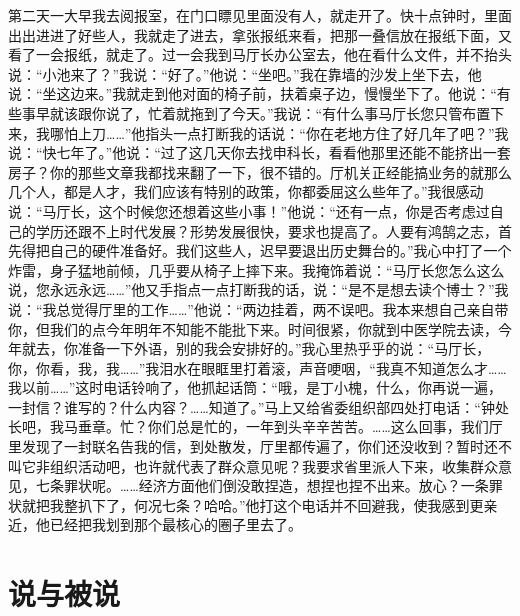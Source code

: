 \documentclass[12pt,oneside]{book}
\begin{document}
第二天一大早我去阅报室，在门口瞟见里面没有人，就走开了。快十点钟时，里面出出进进了好些人，我就走了进去，拿张报纸来看，把那一叠信放在报纸下面，又看了一会报纸，就走了。过一会我到马厅长办公室去，他在看什么文件，并不抬头说：``小池来了？''我说：``好了。''他说：``坐吧。''我在靠墙的沙发上坐下去，他说：``坐这边来。''我就走到他对面的椅子前，扶着桌子边，慢慢坐下了。他说：``有些事早就该跟你说了，忙着就拖到了今天。''我说：``有什么事马厅长您只管布置下来，我哪怕上刀\ldots\ldots{}''他指头一点打断我的话说：``你在老地方住了好几年了吧？''我说：``快七年了。''他说：``过了这几天你去找申科长，看看他那里还能不能挤出一套房子？你的那些文章我都找来翻了一下，很不错的。厅机关正经能搞业务的就那么几个人，都是人才，我们应该有特别的政策，你都委屈这么些年了。''我很感动说：``马厅长，这个时候您还想着这些小事！''他说：``还有一点，你是否考虑过自己的学历还跟不上时代发展？形势发展很快，要求也提高了。人要有鸿鹄之志，首先得把自己的硬件准备好。我们这些人，迟早要退出历史舞台的。''我心中打了一个炸雷，身子猛地前倾，几乎要从椅子上摔下来。我掩饰着说：``马厅长您怎么这么说，您永远永远\ldots\ldots{}''他又手指点一点打断我的话，说：``是不是想去读个博士？''我说：``我总觉得厅里的工作\ldots\ldots{}''他说：``两边挂着，两不误吧。我本来想自己亲自带你，但我们的点今年明年不知能不能批下来。时间很紧，你就到中医学院去读，今年就去，你准备一下外语，别的我会安排好的。''我心里热乎乎的说：``马厅长，你，你看，我，我\ldots\ldots{}''我泪水在眼眶里打着滚，声音哽咽，``我真不知道怎么才\ldots\ldots 我以前\ldots\ldots{}''这时电话铃响了，他抓起话筒：``哦，是丁小槐，什么，你再说一遍，一封信？谁写的？什么内容？\ldots\ldots 知道了。''马上又给省委组织部四处打电话：``钟处长吧，我马垂章。忙？你们总是忙的，一年到头辛辛苦苦。\ldots\ldots 这么回事，我们厅里发现了一封联名告我的信，到处散发，厅里都传遍了，你们还没收到？暂时还不叫它非组织活动吧，也许就代表了群众意见呢？我要求省里派人下来，收集群众意见，七条罪状呢。\ldots\ldots 经济方面他们倒没敢捏造，想捏也捏不出来。放心？一条罪状就把我整扒下了，何况七条？哈哈。''他打这个电话并不回避我，使我感到更亲近，他已经把我划到那个最核心的圈子里去了。


\chapter{说与被说}
\end{document}
